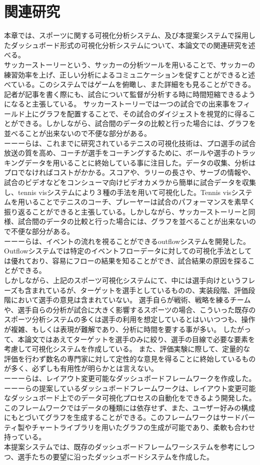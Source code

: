 \documentclass[sotsuron]{kuee}
\begin{document}
\chapter{関連研究}
本章では、スポーツに関する可視化分析システム、及び本提案システムで採用したダッシュボード形式の可視化分析システムについて、本論文での関連研究を述べる。
\\サッカーストーリーという、サッカーの分析ツールを用いることで、サッカーの練習効率を上げ、正しい分析によるコミュニケーションを促すことができると述べている。このシステムではゲームを俯瞰し、また詳細をも見ることができる。記者が記事を書く際にも、試合について監督が分析する時に時間短縮できるようになると主張している。
サッカーストーリーでは一つの試合での出来事をフィールド上にグラフを配置することで、その試合のダイジェストを視覚的に得ることができる。しかしながら、試合間のデータの比較と行った場合には、グラフを並べることが出来ないので不便な部分がある。
\\ーーーらは、これまでに研究されているテニスの可視化技術は、プロ選手の試合放送の質を高め、コーチが選手をコーチングするために、ボールや選手のトラッキングデータを用いることに終始している事に注目した。データの収集、分析はプロでなければコストがかかる。スコアや、ラリーの長さや、サーブの情報や、試合のビデオなどをコンシューマ向けビデオカメラから簡単に試合データを収集し、tennis visシステムにより３種の手法を用いて可視化した。Tennis visシステムを用いることでテニスのコーチ、プレーヤーは試合のパフォーマンスを素早く振り返ることができると主張している。しかしながら、サッカーストーリーと同様、試合間のデータの比較と行った場合には、グラフを並べることが出来ないので不便な部分がある。
\\ーーーらは、イベントの流れを視ることができるoutflowシステムを開発した。Outflowシステムでは特定のイベントフローデータに対しての可視化手法としては優れており、容易にフローの結果を知ることができ、試合結果の原因を探ることができる。
\\しかしながら、上記のスポーツ可視化システムにて、中には選手向けというフレーズも含まれているが、ターゲットを選手としているものの、実装段階、評価段階において選手の意見は含まれていない。
選手自らが戦術、戦略を練るチームや、選手自らの分析が試合に大きく影響するスポーツの場合、こういった既存のスポーツ分析システムの多くは選手の利用を想定しているとはいいつつも、操作が複雑、もしくは表現が難解であり、分析に時間を要する事が多い。
したがって、本論文ではあえてターゲットを選手のみに絞り、選手の目線で必要な要素を考慮して可視化システムを作成している。
また、評価実験に際して、定量的な評価を行わず数名の専門家に対して定性的な意見を得ることに終始しているものが多く、必ずしも有用性が明らかとは言えない。
\\ーーーらは、レイアウト変更可能なダッシュボードフレームワークを作成した。ーーーらの提案しているダッシュボードフレームワークは、レイアウト変更可能なダッシュボード上でのデータ可視化プロセスの自動化をできるよう開発した。このフレームワークではデータの種類には依存せず、また、ユーザー好みの構成にもとづいてグラフを生成することができる。このフレームワークはサードパーティ製やチャートライブラリを用いたグラフの生成が可能であり、柔軟も合わせ持っている。
\\本提案システムでは、既存のダッシュボードフレームワーシステムを参考にしつつ、選手たちの要望に沿ったダッシュボードシステムを作成した。
\end{document}
